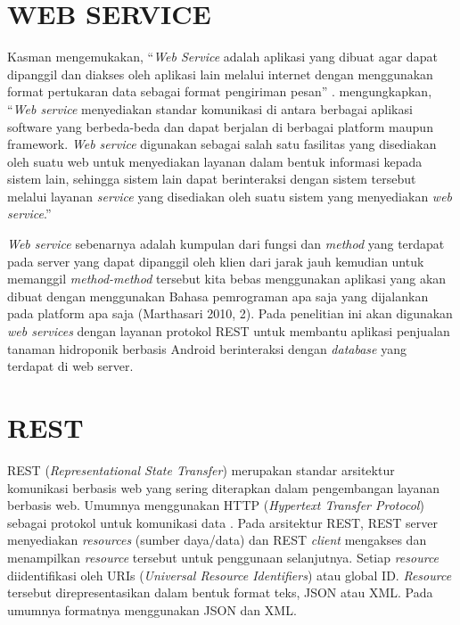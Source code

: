 \section{\uppercase{Web Service}}
Kasman mengemukakan, “\textit{Web Service} adalah aplikasi yang dibuat agar dapat dipanggil dan diakses oleh aplikasi lain melalui internet dengan menggunakan format pertukaran data sebagai format pengiriman pesan” \citep{kasman2015}. \cite{hartono2012pengaruh} mengungkapkan, “\textit{Web service} menyediakan standar komunikasi di antara berbagai aplikasi software yang berbeda-beda dan dapat berjalan di berbagai platform maupun framework. \textit{Web service} digunakan sebagai salah satu fasilitas yang disediakan oleh suatu web untuk menyediakan layanan dalam bentuk informasi kepada sistem lain, sehingga sistem lain dapat berinteraksi dengan sistem tersebut melalui layanan \textit{service} yang disediakan oleh suatu sistem yang menyediakan \textit{web service}.” 

\par \textit{Web service} sebenarnya adalah kumpulan dari fungsi dan \textit{method} yang terdapat pada server yang dapat dipanggil oleh klien dari jarak jauh kemudian untuk memanggil \textit{method-method} tersebut kita bebas menggunakan aplikasi yang akan dibuat dengan menggunakan Bahasa pemrograman apa saja yang dijalankan pada platform apa saja (Marthasari 2010, 2). Pada penelitian ini akan digunakan \textit{web services} dengan layanan protokol REST untuk membantu aplikasi penjualan tanaman hidroponik berbasis Android berinteraksi dengan \textit{database} yang terdapat di web server.

\section{\uppercase{REST}}
REST (\textit{Representational State Transfer}) merupakan standar arsitektur komunikasi berbasis web yang sering diterapkan dalam pengembangan layanan berbasis web. Umumnya menggunakan HTTP (\textit{Hypertext Transfer Protocol}) sebagai protokol untuk komunikasi data \citep{fielding2000architectural}. Pada arsitektur REST, REST server menyediakan \textit{resources} (sumber daya/data) dan REST \textit{client} mengakses dan menampilkan \textit{resource} tersebut untuk penggunaan selanjutnya. Setiap \textit{resource} diidentifikasi oleh URIs (\textit{Universal Resource Identifiers}) atau global ID. \textit{Resource} tersebut direpresentasikan dalam bentuk format teks, JSON atau XML. Pada umumnya formatnya menggunakan JSON dan XML.

